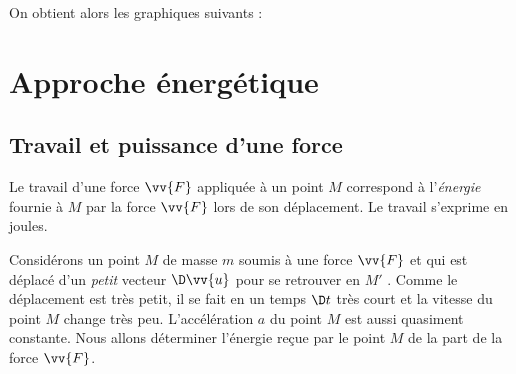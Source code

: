 \documentclass{cours}
\begin{document}
On obtient alors les graphiques suivants :
\begin{center}
\end{center}






\section{Approche énergétique}%
\label{sec:approche_energetique}
\subsection{Travail et puissance d'une force}%
\label{sub:travail_et_puissance_d_une_force}

Le travail d'une force $\vv{F}$ appliquée à un point $M$ correspond à l'\emph{énergie} fournie à $M$ par la force $\vv{F}$ lors de son déplacement. Le travail s'exprime en joules.

Considérons un point $M$ de masse $m$ soumis à une force $\vv{F}$ et qui est déplacé d'un \emph{petit} vecteur $\D \vv{u}$ pour se retrouver en $M'$ . Comme le déplacement est très petit, il se fait en un temps $\D t$  très court et la vitesse du point $M$  change très peu. L'accélération $a$ du point $M$ est aussi quasiment constante. Nous allons déterminer l'énergie reçue par le point $M$ de la part de la force $\vv{F}$.  
\end{document}
